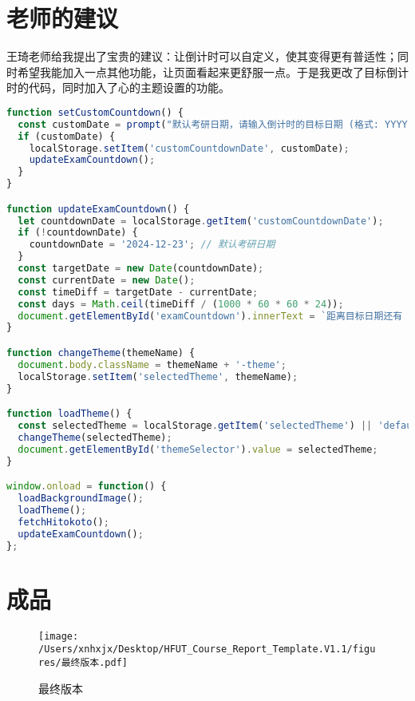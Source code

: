 \documentclass{hfutreport}
\begin{document}
\section{老师的建议}
王琦老师给我提出了宝贵的建议：让倒计时可以自定义，使其变得更有普适性；同时希望我能加入一点其他功能，让页面看起来更舒服一点。于是我更改了目标倒计时的代码，同时加入了心的主题设置的功能。

\begin{lstlisting}[language=javascript]
function setCustomCountdown() {
  const customDate = prompt("默认考研日期，请输入倒计时的目标日期 (格式: YYYY-MM-DD):");
  if (customDate) {
    localStorage.setItem('customCountdownDate', customDate);
    updateExamCountdown();
  }
}

function updateExamCountdown() {
  let countdownDate = localStorage.getItem('customCountdownDate');
  if (!countdownDate) {
    countdownDate = '2024-12-23'; // 默认考研日期
  }
  const targetDate = new Date(countdownDate);
  const currentDate = new Date();
  const timeDiff = targetDate - currentDate;
  const days = Math.ceil(timeDiff / (1000 * 60 * 60 * 24));
  document.getElementById('examCountdown').innerText = `距离目标日期还有 ${days} 天`;
}

function changeTheme(themeName) {
  document.body.className = themeName + '-theme';
  localStorage.setItem('selectedTheme', themeName);
}

function loadTheme() {
  const selectedTheme = localStorage.getItem('selectedTheme') || 'default';
  changeTheme(selectedTheme);
  document.getElementById('themeSelector').value = selectedTheme;
}

window.onload = function() {
  loadBackgroundImage();
  loadTheme();
  fetchHitokoto();
  updateExamCountdown();
};
\end{lstlisting}

\newpage
\section{成品}

\begin{figure}[hbtp]
  \centering
  \texttt{[image: /Users/xnhxjx/Desktop/HFUT\_Course\_Report\_Template.V1.1/figures/最终版本.pdf]}
  \caption{最终版本}
\end{figure}
\end{document}
